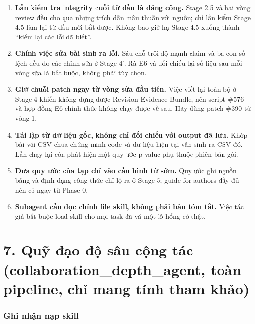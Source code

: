 \documentclass[12pt,a4paper]{article}
\providecommand{\tightlist}{\setlength{\itemsep}{0pt}\setlength{\parskip}{0pt}}
\begin{document}
\begin{enumerate}
\def\labelenumi{\arabic{enumi}.}
\tightlist
\item
  \textbf{Lần kiểm tra integrity cuối từ đầu là đáng công.} Stage 2.5 và
  hai vòng review đều cho qua những trích dẫn mâu thuẫn với nguồn; chỉ
  lần kiểm Stage 4.5 làm lại từ đầu mới bắt được. Không bao giờ hạ Stage
  4.5 xuống thành ``kiểm lại các lỗi đã biết''.
\item
  \textbf{Chính việc sửa bài sinh ra lỗi.} Sáu chỗ trôi độ mạnh claim và
  ba con số lệch đều do các chỉnh sửa ở Stage 4′. Rà E6 và đối chiếu lại
  số liệu sau mỗi vòng sửa là bắt buộc, không phải tùy chọn.
\item
  \textbf{Giữ chuỗi patch ngay từ vòng sửa đầu tiên.} Việc viết lại toàn
  bộ ở Stage 4 khiến không dựng được Revision-Evidence Bundle, nên
  script \#576 và hợp đồng E6 chính thức không chạy được về sau. Hãy
  dùng patch \#390 từ vòng 1.
\item
  \textbf{Tái lập từ dữ liệu gốc, không chỉ đối chiếu với output đã
  lưu.} Khớp bài với CSV chưa chứng minh code và dữ liệu hiện tại vẫn
  sinh ra CSV đó. Lần chạy lại còn phát hiện một quy ước p-value phụ
  thuộc phiên bản gói.
\item
  \textbf{Đưa quy ước của tạp chí vào cấu hình từ sớm.} Quy ước ghi
  nguồn bảng và định dạng công thức chỉ lộ ra ở Stage 5; guide for
  authors đầy đủ nên có ngay từ Phase 0.
\item
  \textbf{Subagent cần đọc chính file skill, không phải bản tóm tắt.}
  Việc tác giả bắt buộc load skill cho mọi task đã vá một lỗ hổng có
  thật.
\end{enumerate}

\hypertarget{quux1ef9-ux111ux1ea1o-ux111ux1ed9-suxe2u-cux1ed9ng-tuxe1c-collaboration_depth_agent-touxe0n-pipeline-chux1ec9-mang-tuxednh-tham-khux1ea3o}{%
\section{7. Quỹ đạo độ sâu cộng tác (collaboration\_depth\_agent, toàn
pipeline, chỉ mang tính tham
khảo)}\label{quux1ef9-ux111ux1ea1o-ux111ux1ed9-suxe2u-cux1ed9ng-tuxe1c-collaboration_depth_agent-touxe0n-pipeline-chux1ec9-mang-tuxednh-tham-khux1ea3o}}

\hypertarget{ghi-nhux1eadn-nux1ea1p-skill}{%
\subsubsection{Ghi nhận nạp skill}\label{ghi-nhux1eadn-nux1ea1p-skill}}
\end{document}
